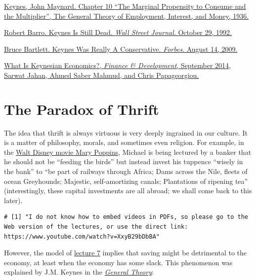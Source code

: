 \documentclass[]{book}
\theoremstyle{definition}
\theoremstyle{definition}
\theoremstyle{definition}
\theoremstyle{remark}
\begin{document}
\href{https://cas2.umkc.edu/economics/people/facultypages/kregel/courses/econ645/winter2011/generaltheory.pdf}{Keynes,
John Maynard. Chapter 10 ``The Marginal Propensity to Consume and the
Multiplier'', The General Theory of Employment, Interest, and Money,
1936.}

\href{https://search.proquest.com/docview/398378701/fulltext/CBD1D9A468D04A85PQ/4?accountid=14512}{Robert
Barro. Keynes Is Still Dead. \emph{Wall Street Journal}. October 29,
1992.}

\href{https://www.forbes.com/2009/08/13/john-maynard-keynes-conservative-opinions-columnists-bruce-bartlett.html}{Bruce
Bartlett. Keynes Was Really A Conservative. \emph{Forbes}. August 14,
2009.}

\href{http://www.imf.org/external/pubs/ft/fandd/2014/09/pdf/basics.pdf}{What
Is Keynesian Economics?, \emph{Finance \& Development}, September 2014,
Sarwat Jahan, Ahmed Saber Mahmud, and Chris Papageorgiou.}

\hypertarget{paradox-thrift}{\chapter{The Paradox of
Thrift}\label{paradox-thrift}}

The idea that thrift is always virtuous is very deeply ingrained in our
culture. It is a matter of philosophy, morals, and sometimes even
religion. For example, in the
\href{https://www.youtube.com/watch?v=XxyB29bDbBA}{Walt Disney movie
Mary Poppins}, Michael is being lectured by a banker that he should not
be ``feeding the birds'' but instead invest his tuppence ``wisely in the
bank'' to ``be part of railways through Africa; Dams across the Nile,
fleets of ocean Greyhounds; Majestic, self-amortizing canals;
Plantations of ripening tea'' (interestingly, these capital investments
are all abroad; we shall come back to this later).

\begin{verbatim}
# [1] "I do not know how to embed videos in PDFs, so please go to the Web version of the lectures, or use the direct link: https://www.youtube.com/watch?v=XxyB29bDbBA"
\end{verbatim}

However, the model of \protect\hyperlink{cons-function}{lecture 7}
implies that saving might be detrimental to the economy, at least when
the economy has some slack. This phenomenon was explained by J.M. Keynes
in the
\href{http://cas2.umkc.edu/economics/people/facultypages/kregel/courses/econ645/winter2011/generaltheory.pdf}{\emph{General
Theory}}:
\end{document}
